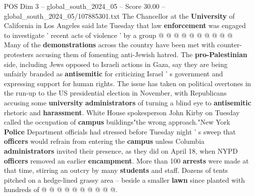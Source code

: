 \begin{textsample}{POS Dim 3 – global\_south\_2024\_05 – Score 30.00 – global\_south\_2024\_05/107885301.txt}
The Chancellor at the \textbf{University} of California in Los Angeles said late Tuesday that law \textbf{enforcement} was engaged to investigate ' recent acts of violence ' by a group @ @ @ @ @ @ @ @ @ @ Many of the \textbf{demonstrations} across the country have been met with counter-protesters accusing them of fomenting anti-Jewish hatred.
The \textbf{pro-Palestinian} side, including Jews opposed to Israeli actions in Gaza, say they are being unfairly branded as \textbf{antisemitic} for criticizing Israel ' s government and expressing support for human rights.
The issue has taken on political overtones in the run-up to the US presidential election in November, with Republicans accusing some \textbf{university} \textbf{administrators} of turning a blind eye to \textbf{antisemitic} rhetoric and \textbf{harassment}.
White House spokesperson John Kirby on Tuesday called the occupation of \textbf{campus} buildings"the wrong approach."New York \textbf{Police} Department officials had stressed before Tuesday night ' s sweep that \textbf{officers} would refrain from entering the \textbf{campus} unless Columbia \textbf{administrators} invited their presence, as they did on April 18, when NYPD \textbf{officers} removed an earlier \textbf{encampment}.
More than 100 \textbf{arrests} were made at that time, stirring an outcry by many \textbf{students} and staff.
Dozens of tents pitched on a hedge-lined grassy area -- beside a smaller \textbf{lawn} since planted with hundreds of @ @ @ @ @ @ @ @ @ @.

\end{textsample}

